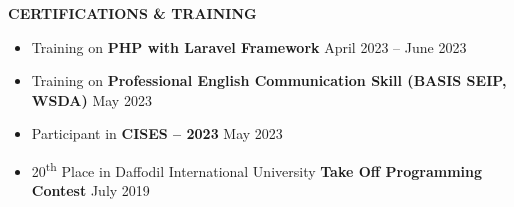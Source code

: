 \documentclass[a4paper, 12pt]{article}
\begin{document}
\begin{flushleft}
	\noindent
	\textbf{CERTIFICATIONS \& TRAINING}\hrulefill
\end{flushleft}
\vspace{-12pt}

\begin{itemize}[noitemsep, topsep=0pt, partopsep=0pt, parsep=0pt]
	\item Training on \textbf{PHP with Laravel Framework} \hfill April 2023 -- June 2023
	\item Training on \textbf{Professional English Communication Skill (BASIS SEIP, WSDA)} \hfill May 2023
	\item Participant in \textbf{CISES -- 2023} \hfill May 2023
	\item 20\textsuperscript{th} Place in Daffodil International University \textbf{Take Off Programming Contest} \hfill July 2019
\end{itemize}
\end{document}
